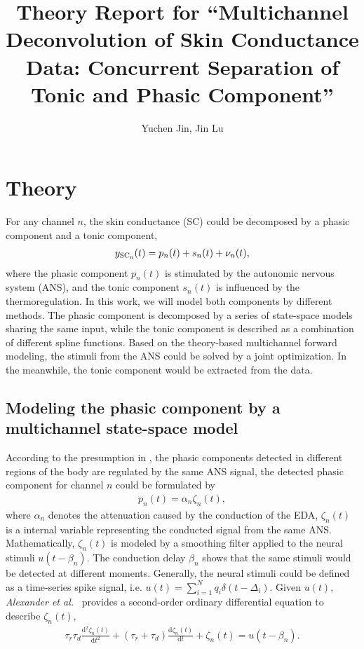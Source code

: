 \documentclass[]{article}
\title{Theory Report for ``Multichannel Deconvolution of Skin Conductance Data: Concurrent Separation of Tonic and Phasic Component''}
\author{Yuchen Jin, Jin Lu}
\providecommand{\od}{\mathrm{d}}
\begin{document}
\maketitle

\section{Theory}

For any channel $n$, the skin conductance (SC) could be decomposed by a phasic component and a tonic component,
\begin{align}
  y_{\rm{SC}_n}(t) = p_n(t) + s_n(t) + \nu_n(t),
\end{align}
where the phasic component $p_n(t)$ is stimulated by the autonomic nervous system (ANS), and the tonic component $s_n(t)$ is influenced by the thermoregulation. In this work, we will model both components by different methods. The phasic component is decomposed by a series of state-space models sharing the same input, while the tonic component is described as a combination of different spline functions. Based on the theory-based multichannel forward modeling, the stimuli from the ANS could be solved by a joint optimization. In the meanwhile, the tonic component would be extracted from the data.

\subsection{Modeling the phasic component by a multichannel state-space model}
According to the presumption in \cite{alexander2005separating,society2012publication,amin2019robust}, the phasic components detected in different regions of the body are regulated by the same ANS signal, the detected phasic component for channel $n$ could be formulated by
\begin{align}
  p_n(t) = \alpha_n \zeta_n (t),
\end{align}
where $\alpha_n$ denotes the attenuation caused by the conduction of the EDA, $\zeta_n(t)$ is a internal variable representing the conducted signal from the same ANS. Mathematically, $\zeta_n(t)$ is modeled by a smoothing filter applied to the neural stimuli $u(t-\beta_n)$. The conduction delay $\beta_n$ shows that the same stimuli would be detected at different moments. Generally, the neural stimuli could be defined as a time-series spike signal, i.e. $u(t) = \sum_{i=1}^N q_i \delta(t - \Delta_i)$. Given $u(t)$, \textit{Alexander et al.}~\cite{alexander2005separating} provides a second-order ordinary differential equation to describe $\zeta_n(t)$,
\begin{align} \label{fml:the:ode}
  \tau_r \tau_d \frac{\od^2 \zeta_n(t)}{\od t^2} + (\tau_r + \tau_d) \frac{\od \zeta_n(t)}{\od t} + \zeta_n(t) = u(t - \beta_n).
\end{align}
\end{document}
